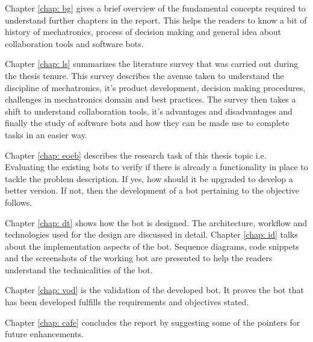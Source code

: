 Chapter \ref{chap: bg} gives a brief overview of the fundamental concepts required to understand further chapters in the report. This helps the readers to know a bit of history of mechatronics, process of decision making and  general idea about collaboration tools and software bots.

Chapter \ref{chap: ls} summarizes the literature survey that was carried out during the thesis tenure. This survey describes the avenue taken to understand the discipline of mechatronics, it's product development, decision making procedures, challenges in mechatronics domain and best practices. The survey then takes a shift to understand collaboration tools, it's advantages and disadvantages and finally the study of software bots and how they can be made use to complete tasks in an easier way.

Chapter \ref{chap: eoeb} describes the research task of this thesis topic i.e. Evaluating the existing bots to verify if there is already a functionality in place to tackle the problem description. If yes, how should it be upgraded to develop a better version. If not, then the development of a bot pertaining to the objective follows.

Chapter \ref{chap: dt} shows how the bot is designed. The architecture, workflow and technologies used for the design are discussed in detail. Chapter \ref{chap: id} talks about the implementation aspects of the bot. Sequence diagrams, code snippets and the screenshots of the working bot are presented to help the readers understand the technicalities of the bot.

Chapter \ref{chap: vod} is the validation of the developed bot. It proves the bot that has been developed fulfills the requirements and objectives stated. 

Chapter \ref{chap: cafe} concludes the report by suggesting some of the pointers for future enhancements.

